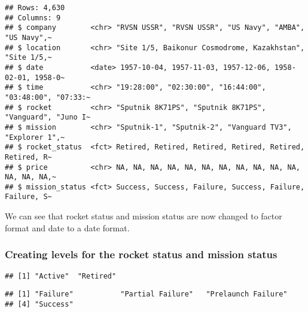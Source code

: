 \documentclass[
]{article}
\newenvironment{Shaded}{\begin{snugshade}}{\end{snugshade}}
\newcommand{\FunctionTok}[1]{\textcolor[rgb]{0.13,0.29,0.53}{\textbf{#1}}}
\newcommand{\NormalTok}[1]{#1}
\newcommand{\SpecialCharTok}[1]{\textcolor[rgb]{0.81,0.36,0.00}{\textbf{#1}}}
\begin{document}
\begin{verbatim}
## Rows: 4,630
## Columns: 9
## $ company        <chr> "RVSN USSR", "RVSN USSR", "US Navy", "AMBA", "US Navy",~
## $ location       <chr> "Site 1/5, Baikonur Cosmodrome, Kazakhstan", "Site 1/5,~
## $ date           <date> 1957-10-04, 1957-11-03, 1957-12-06, 1958-02-01, 1958-0~
## $ time           <chr> "19:28:00", "02:30:00", "16:44:00", "03:48:00", "07:33:~
## $ rocket         <chr> "Sputnik 8K71PS", "Sputnik 8K71PS", "Vanguard", "Juno I~
## $ mission        <chr> "Sputnik-1", "Sputnik-2", "Vanguard TV3", "Explorer 1",~
## $ rocket_status  <fct> Retired, Retired, Retired, Retired, Retired, Retired, R~
## $ price          <chr> NA, NA, NA, NA, NA, NA, NA, NA, NA, NA, NA, NA, NA, NA,~
## $ mission_status <fct> Success, Success, Failure, Success, Failure, Failure, S~
\end{verbatim}

We can see that rocket status and mission status are now changed to
factor format and date to a date format.

\hypertarget{creating-levels-for-the-rocket-status-and-mission-status}{%
\subsubsection{Creating levels for the rocket status and mission
status}\label{creating-levels-for-the-rocket-status-and-mission-status}}

\begin{Shaded}
\end{Shaded}

\begin{verbatim}
## [1] "Active"  "Retired"
\end{verbatim}

\begin{Shaded}
\end{Shaded}

\begin{verbatim}
## [1] "Failure"           "Partial Failure"   "Prelaunch Failure"
## [4] "Success"
\end{verbatim}
\end{document}
